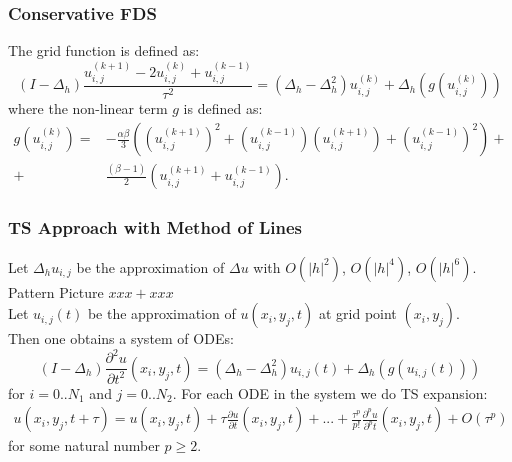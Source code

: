 \documentclass{beamer}
\newcommand{\be}{\begin{equation}}
\newcommand{\ee}{\end{equation}}
\newcommand{\RR}{\mathbb{R}}
\begin{document}

\begin{frame}
\frametitle{Conservative FDS}
The grid function is defined as:
\begin{equation}
(I-\Delta_h)\frac{ u^{(k+1)}_{i, j} - 2u^{(k)}_{i,j} + u^{(k-1)}_{i,j} }{\tau^2} = (\Delta_h - \Delta_h^2)u^{(k)}_{i,j} + \Delta_h(g(u^{(k)}_{i,j}))
\end{equation}
%
where the non-linear term $g$ is defined as:
\begin{align}
g(u^{(k)}_{i,j})=& -\frac{\alpha \beta} { 3 } \left( (u^{(k+1)}_{i,j})^2 + (u^{(k-1)}_{i,j})(u^{(k+1)}_{i,j}) + (u^{(k-1)}_{i,j})^2 \right) + \nonumber\\
+&\frac{ (\beta - 1 )}{ 2 }\left( u^{(k+1)}_{i,j} + u^{(k-1)}_{i,j} \right).
\end{align}


\end{frame}



\begin{frame}
\frametitle{TS Approach with Method of Lines}

Let $\Delta_h u_{i,j}$ be the approximation of $\Delta u$ with $O(|h|^2)$, $O(|h|^4)$, $O(|h|^6)$.
\\
Pattern Picture $x x x + x x x$
\\
Let $u_{i,j}(t)$ be the approximation of $u(x_i, y_j, t)$ at grid point $(x_i, y_j)$.
\\
Then one obtains a system of ODEs:
\be \label{DiscreteEq}
 (I-\Delta_h) \frac{\partial^2 u}{\partial t^2}(x_i, y_j, t)=
 (\Delta_h - \Delta_h^2) u_{i, j}(t) + \Delta_h ( g( u_{i, j}(t) ) )
\ee
for $i = 0..N_1$ and $j=0..N_2$. For each ODE in the system we do TS expansion:
\begin{align} \label{TSe}
u(x_i, y_j, t+\tau) = u(x_i, y_j, t) + \tau \frac{ \partial u }{ \partial t }(x_i, y_j, t)  + ... 
+ \frac{ \tau^p }{ p! } \frac{ \partial^p u }{ \partial^p t }(x_i, y_j, t) + O(\tau^p)
\end{align}
for some natural number $p \ge 2$.


\end{frame}
\end{document}
